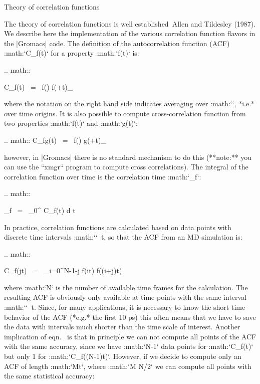 Theory of correlation functions
~~~~~~~~~~~~~~~~~~~~~~~~~~~~~~~

The theory of correlation functions is well established Allen and
Tildesley (1987). We describe here the implementation of the various
correlation
function flavors in the
|Gromacs| code. The definition of the autocorrelation
function
(ACF)
:math:`C_f(t)` for a property :math:`f(t)` is:

.. math::

   C_f(t)  ~=~     \left\langle f(\xi) f(\xi+t)\right\rangle_{\xi}
   \label{eqn:corr}

where the notation on the right hand side indicates averaging over
:math:`\xi`, *i.e.* over time origins. It is also possible to compute
cross-correlation function from two properties :math:`f(t)` and
:math:`g(t)`:

.. math:: C_{fg}(t) ~=~   \left\langle f(\xi) g(\xi+t)\right\rangle_{\xi}

however, in |Gromacs| there is no standard mechanism to do this
(**note:** you can use the ``xmgr``
program to compute cross correlations). The integral of the correlation
function over time is the correlation time :math:`\tau_f`:

.. math::

   \tau_f  ~=~     \int_0^{\infty} C_f(t) {\rm d} t
   \label{eqn:corrtime}

In practice, correlation functions are calculated based on data points
with discrete time intervals :math:`\Delta`\ t, so that the ACF from an
MD simulation is:

.. math::

   C_f(j\Delta t)  ~=~     \sum_{i=0}^{N-1-j} f(i\Delta t) f((i+j)\Delta t)
   \label{eqn:corrmd}

where :math:`N` is the number of available time frames for the
calculation. The resulting ACF is obviously only available at time
points with the same interval :math:`\Delta`\ t. Since, for many
applications, it is necessary to know the short time behavior of the ACF
(*e.g.* the first 10 ps) this often means that we have to save the data
with intervals much shorter than the time scale of interest. Another
implication of eqn. 
is that in principle
we can not compute all points of the ACF with the same accuracy, since
we have :math:`N-1` data points for :math:`C_f(\Delta t)` but only 1 for
:math:`C_f((N-1)\Delta t)`. However, if we decide to compute only an ACF
of length :math:`M\Delta t`, where :math:`M \leq N/2` we can compute all
points with the same statistical accuracy:

